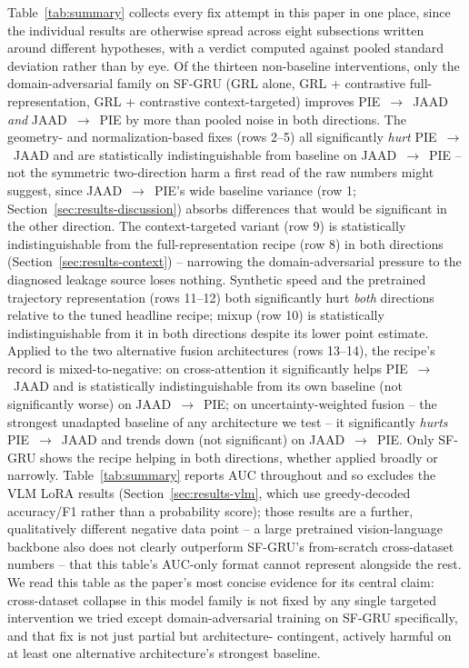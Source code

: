 Table~\ref{tab:summary} collects every fix attempt in this paper in one
place, since the individual results are otherwise spread across eight
subsections written around different hypotheses, with a verdict
computed against pooled standard deviation rather than by eye. Of the
thirteen non-baseline interventions, only the domain-adversarial family
on SF-GRU (GRL alone, GRL + contrastive full-representation, GRL +
contrastive context-targeted) improves PIE~$\to$~JAAD \emph{and}
JAAD~$\to$~PIE by more than pooled noise in both directions. The
geometry- and normalization-based fixes (rows 2--5) all significantly
\emph{hurt} PIE~$\to$~JAAD and are statistically indistinguishable
from baseline on JAAD~$\to$~PIE -- not the symmetric two-direction harm
a first read of the raw numbers might suggest, since JAAD~$\to$~PIE's
wide baseline variance (row 1; Section~\ref{sec:results-discussion})
absorbs differences that would be significant in the other direction.
The context-targeted variant (row 9) is statistically indistinguishable
from the full-representation recipe (row 8) in both directions
(Section~\ref{sec:results-context}) -- narrowing the domain-adversarial
pressure to the diagnosed leakage source loses nothing. Synthetic speed
and the pretrained trajectory representation (rows 11--12) both
significantly hurt \emph{both} directions relative to the tuned
headline recipe; mixup (row 10) is statistically indistinguishable from
it in both directions despite its lower point estimate. Applied to the
two alternative fusion architectures (rows 13--14), the recipe's record
is mixed-to-negative: on cross-attention it significantly helps
PIE~$\to$~JAAD and is statistically indistinguishable from its own
baseline (not significantly worse) on JAAD~$\to$~PIE; on
uncertainty-weighted fusion -- the strongest unadapted baseline of any
architecture we test -- it significantly \emph{hurts} PIE~$\to$~JAAD
and trends down (not significant) on JAAD~$\to$~PIE. Only SF-GRU shows
the recipe helping in both directions, whether applied broadly or
narrowly. Table~\ref{tab:summary} reports
AUC throughout and so excludes the VLM LoRA results
(Section~\ref{sec:results-vlm}, which use greedy-decoded accuracy/F1
rather than a probability score); those results are a further,
qualitatively different negative data point -- a large pretrained
vision-language backbone also does not clearly outperform SF-GRU's
from-scratch cross-dataset numbers -- that this table's AUC-only format
cannot represent alongside the rest. We read this table as the
paper's most concise evidence for its central claim: cross-dataset
collapse in this model family is not fixed by any single targeted
intervention we tried except domain-adversarial training on SF-GRU
specifically, and that fix is not just partial but architecture-
contingent, actively harmful on at least one alternative architecture's
strongest baseline.

